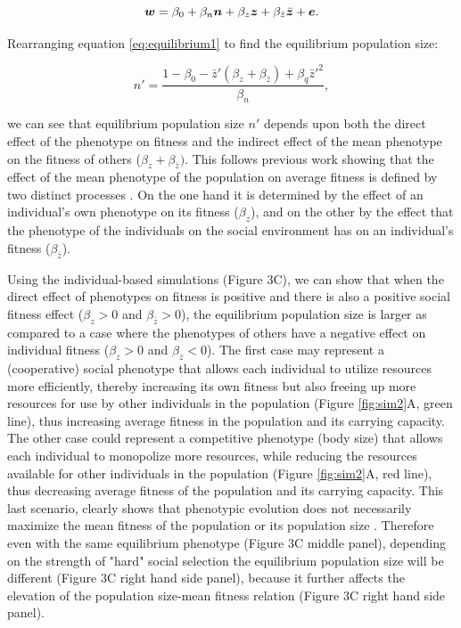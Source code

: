 \documentclass{article}
\begin{document}
\begin{equation} \label{eq: socialselection}
\vectorsym{w}=\beta_{0} +\beta_{n} \vectorsym{n} + \beta_{z} \vectorsym{z}+ \beta_{\bar{z}} \bar{\vectorsym{z}}+ \vectorsym{e}.
\end{equation}
 
\noindent Rearranging equation \ref{eq:equilibrium1} to find the equilibrium population size:
 
\begin{equation}
n' = \frac{1-\beta_{0} - \bar{z}'(\beta_{z} + \beta_{\bar{z}} )+  \beta_{q} \bar{z}'^2}{\beta_{n}},
\end{equation}

\noindent we can see that equilibrium population size $n'$ depends upon both the direct effect of the phenotype on fitness and the indirect effect of the mean phenotype on the fitness of others ($\beta_{z} + \beta_{\bar{z}})$. This follows previous work showing that the effect of the mean phenotype of the population on average fitness is defined by two distinct processes \citep{Engen2020, Lande2007, Abrams1993}. On the one hand it is determined by the effect of an individual's own phenotype on its fitness ($\beta_{z}$), and on the other by the effect that the phenotype of the individuals on the social environment has on an individual's fitness ($\beta_{\bar{z}}$).

Using the individual-based simulations (Figure 3C), we can show that when the direct effect of phenotypes on fitness is positive and there is also a positive social fitness effect ($\beta_{z}>0$ and $\beta_{\bar{z}}>0$), the equilibrium population size is larger as compared to a case where the phenotypes of others have a negative effect on individual fitness ($\beta_{z}>0$ and $\beta_{\bar{z}}<0$). The first case may represent a (cooperative) social phenotype that allows each individual to utilize resources more efficiently, thereby increasing its own fitness but also freeing up more resources for use by other individuals in the population (Figure \ref{fig:sim2}A, green line), thus increasing average fitness in the population and its carrying capacity. The other case could represent a competitive phenotype (body size) that allows each individual to monopolize more resources, while reducing the resources available for other individuals in the population (Figure \ref{fig:sim2}A, red line), thus decreasing average fitness of the population and its carrying capacity. This last scenario, clearly shows that phenotypic evolution does not necessarily maximize the mean fitness of the population or its population size \citep{Wright1969, Abrams1993}. Therefore even with the same equilibrium phenotype (Figure 3C middle panel), depending on the strength of "hard" social selection the equilibrium population size will be different (Figure 3C right hand side panel), because it further affects the elevation of the population size-mean fitness relation (Figure 3C right hand side panel).
\end{document}
